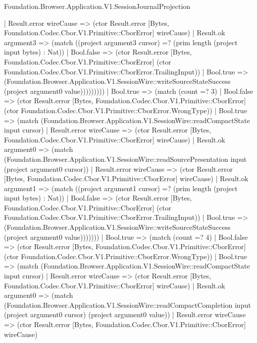 \begin{lexlean}{Foundation.Browser.Application.V1.SessionJournalProjection}
\begin{semanticmodule}
{                            | Result.error wireCause => (ctor Result.error [Bytes, Foundation.Codec.Cbor.V1.Primitive::CborError] wireCause)
                            | Result.ok argument3 => (match ((project argument3 cursor) =? (prim length (project input bytes) : Nat))
                              | Bool.false => (ctor Result.error [Bytes, Foundation.Codec.Cbor.V1.Primitive::CborError] (ctor Foundation.Codec.Cbor.V1.Primitive::CborError.TrailingInput))
                              | Bool.true => (Foundation.Browser.Application.V1.SessionWire::writeSourceStateSuccess (project argument0 value)))))))))
                | Bool.true => (match (count =? 3)
                  | Bool.false => (ctor Result.error [Bytes, Foundation.Codec.Cbor.V1.Primitive::CborError] (ctor Foundation.Codec.Cbor.V1.Primitive::CborError.WrongType))
                  | Bool.true => (match (Foundation.Browser.Application.V1.SessionWire::readCompactState input cursor)
                    | Result.error wireCause => (ctor Result.error [Bytes, Foundation.Codec.Cbor.V1.Primitive::CborError] wireCause)
                    | Result.ok argument0 => (match (Foundation.Browser.Application.V1.SessionWire::readSourcePresentation input (project argument0 cursor))
                      | Result.error wireCause => (ctor Result.error [Bytes, Foundation.Codec.Cbor.V1.Primitive::CborError] wireCause)
                      | Result.ok argument1 => (match ((project argument1 cursor) =? (prim length (project input bytes) : Nat))
                        | Bool.false => (ctor Result.error [Bytes, Foundation.Codec.Cbor.V1.Primitive::CborError] (ctor Foundation.Codec.Cbor.V1.Primitive::CborError.TrailingInput))
                        | Bool.true => (Foundation.Browser.Application.V1.SessionWire::writeSourceStateSuccess (project argument0 value)))))))
              | Bool.true => (match (count =? 4)
                | Bool.false => (ctor Result.error [Bytes, Foundation.Codec.Cbor.V1.Primitive::CborError] (ctor Foundation.Codec.Cbor.V1.Primitive::CborError.WrongType))
                | Bool.true => (match (Foundation.Browser.Application.V1.SessionWire::readCompactState input cursor)
                  | Result.error wireCause => (ctor Result.error [Bytes, Foundation.Codec.Cbor.V1.Primitive::CborError] wireCause)
                  | Result.ok argument0 => (match (Foundation.Browser.Application.V1.SessionWire::readCompactCompletion input (project argument0 cursor) (project argument0 value))
                    | Result.error wireCause => (ctor Result.error [Bytes, Foundation.Codec.Cbor.V1.Primitive::CborError] wireCause)
}
\end{semanticmodule}
\end{lexlean}
